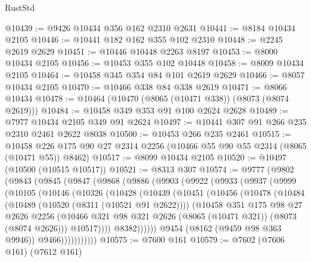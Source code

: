\begin{lexlean}{RustStd}
\begin{coremodule}
@10439 := @9426 @10434 @356 @162 @2310 @2631
@10441 := @8184 @10434 @2105
@10446 := @10441 @182 @162 @355 @102 @2310
@10448 := @2245 @2619 @2629
@10451 := @10446 @10448 @2263 @8197
@10453 := @8000 @10434 @2105
@10456 := @10453 @355 @102 @10448
@10458 := @8009 @10434 @2105
@10464 := @10458 @345 @354 @84 @101 @2619 @2629
@10466 := @8057 @10434 @2105
@10470 := @10466 @338 @84 @338 @2619
@10471 := @8066 @10434
@10478 := @10464 (@10470 (@8065 (@10471 @338)) (@8073 (@8074 @2619)))
@10484 := @10458 @349 @353 @91 @100 @2624 @2628
@10489 := @7977 @10434 @2105 @349 @91 @2624
@10497 := @10441 @307 @91 @266 @235 @2310 @2461 @2622 @8038
@10500 := @10453 @266 @235 @2461
@10515 := @10458 @226 @175 @90 @27 @2314 @2256 (@10466 @55 @90 @55 @2314 (@8065 (@10471 @55)) @8462)
@10517 := @8099 @10434 @2105
@10520 := @10497 (@10500 (@10515 @10517))
@10521 := @8313 @307
@10574 := @9777
    (@9802
      (@9843
        (@9845
          (@9847
            (@9868
              (@9886
                (@9903
                  (@9922
                    (@9933
                      (@9937
                        (@9999
                          (@10105
                            (@10146
                              (@10326
                                (@10428
                                  (@10439
                                    (@10451
                                      (@10456
                                        (@10478
                                          (@10484
                                            (@10489 (@10520 (@8311 (@10521 @91 @2622))))
                                            (@10458
                                              @351
                                              @175
                                              @98
                                              @27
                                              @2626
                                              @2256
                                              (@10466
                                                @321
                                                @98
                                                @321
                                                @2626
                                                (@8065 (@10471 @321))
                                                (@8073 (@8074 @2626)))
                                              @10517))))
                                      @8382))))))
                          @9454
                          (@8162 (@9459 @98 @363 @9946))
                          @9466)))))))))))
@10575 := @7600 @161
@10579 := @7602 (@7606 @161) (@7612 @161)

\end{coremodule}
\end{lexlean}
